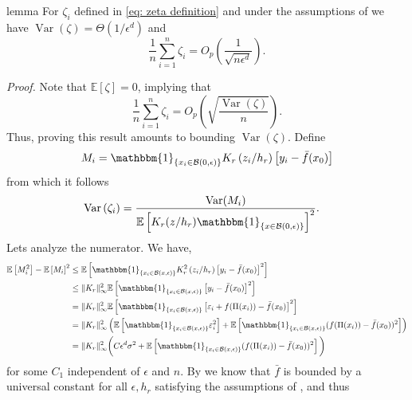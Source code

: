 \documentclass[11pt]{article}
\begin{document}
\begin{restatable}{lemma}{} \label{lemma: zeta}
    For $\zeta_i$ defined in \cref{eq: zeta definition} and under the assumptions of  we have $\operatorname{Var}(\zeta) = \Theta(1/\epsilon^d)$ and 
    \begin{equation*}
        \frac{1}{n}\sum_{i = 1}^n\zeta_i = O_p\left(\frac{1}{\sqrt{n\epsilon^d}}\right).
    \end{equation*}
\end{restatable}
\noindent \textit{Proof.} Note that $\mathbb{E}[\zeta] = 0$, implying that
\[\frac{1}{n}\sum_{i = 1}^n\zeta_i = O_p\left(\sqrt{\frac{\operatorname{Var}(\zeta)}{n}}\right).\]
Thus, proving this result amounts to bounding $\operatorname{Var}(\zeta)$. Define 
\begin{equation*}
    M_i = \mathbbm{1}_{\{x_i \in \mathcal{B}(0, \epsilon)\}}K_r\left(z_i/h_r \right)\left[y_i - \bar{f}(x_0)\right]
\end{equation*}
from which it follows
\begin{align}
    \operatorname{Var}\left(\zeta_i\right)  &= \frac{\operatorname{Var}(M_i)}{\mathbb{E}\left[K_r(z/h_r)\mathbbm{1}_{\{x\in \mathcal{B}(0, \epsilon)\}}\right]^2}. \label{eq: var decomp}
\end{align}
Lets analyze the numerator. We have,
\begin{align*}
    \mathbb{E}\left[M_i^2\right] - \mathbb{E}\left[M_i\right]^2 &\leq \mathbb{E}\left[\mathbbm{1}_{\{x_i \in \mathcal{B}(x, \epsilon)\}}K_r^2\left(z_i/h_r\right)\left[y_i - \bar{f}(x_0)\right]^2\right]  \\
    &\leq \|K_r\|_{\infty}^2\mathbb{E}\left[\mathbbm{1}_{\{x_i \in \mathcal{B}(x, \epsilon)\}}\left[y_i - \bar{f}(x_0)\right]^2\right] \\
    &= \|K_r\|_{\infty}^2\mathbb{E}\left[\mathbbm{1}_{\{x_i \in \mathcal{B}(x, \epsilon)\}}\left[\varepsilon_i + f(\Pi(x_i)) - \bar{f}(x_0)\right]^2\right] \\
    &= \|K_r\|_{\infty}^2\left(\mathbb{E}\left[\mathbbm{1}_{\{x_i \in \mathcal{B}(x, \epsilon)\}}\varepsilon_i^2 \right] + \mathbb{E}\left[\mathbbm{1}_{\{x_i \in \mathcal{B}(x, \epsilon)\}}(f(\Pi(x_i)) - \bar{f}(x_0))^2 \right]\right) \\
    &= \|K_r\|^2_{\infty}\bigg(C\epsilon^d\sigma^2+ \mathbb{E}\left[\mathbbm{1}_{\{x_i \in \mathcal{B}(x, \epsilon)\}}(f(\Pi(x_i)) - \bar{f}(x_0))^2 \right]\bigg)
\end{align*}
for some $C_1$ independent of $\epsilon$ and $n$. By  we know that $\bar{f}$ is bounded by a universal constant for all $\epsilon, h_r$ satisfying the assumptions of , and thus
\end{document}
